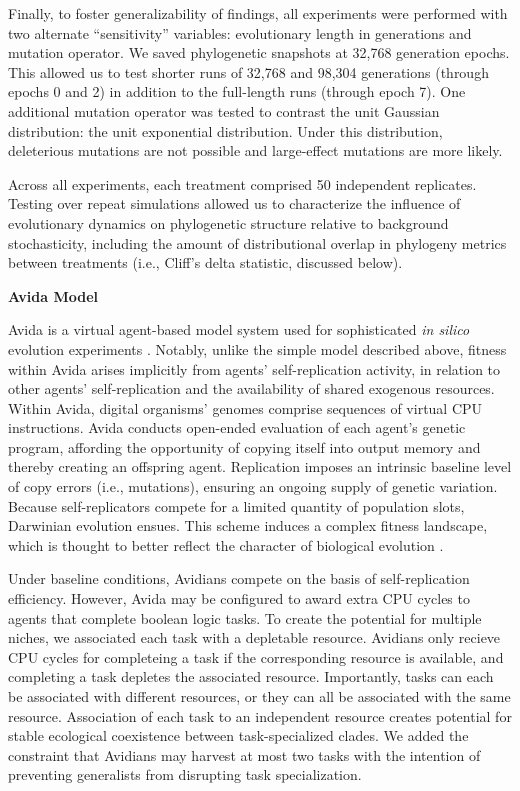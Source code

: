 Finally, to foster generalizability of findings, all experiments were performed with two alternate ``sensitivity'' variables: evolutionary length in generations and mutation operator.
We saved phylogenetic snapshots at 32,768 generation epochs.
This allowed us to test shorter runs of 32,768 and 98,304 generations (through epochs 0 and 2) in addition to the full-length runs (through epoch 7).
One additional mutation operator was tested to contrast the unit Gaussian distribution: the unit exponential distribution.
Under this distribution, deleterious mutations are not possible and large-effect mutations are more likely.

Across all experiments, each treatment comprised 50 independent replicates.
Testing over repeat simulations allowed us to characterize the influence of evolutionary dynamics on phylogenetic structure relative to background stochasticity, including the amount of distributional overlap in phylogeny metrics between treatments (i.e., Cliff's delta statistic, discussed below).

\noindent
\textbf{Avida Model}

\noindent
Avida is a virtual agent-based model system used for sophisticated \textit{in silico} evolution experiments \citep{ofria2004avida}.
Notably, unlike the simple model described above, fitness within Avida arises implicitly from agents' self-replication activity, in relation to other agents' self-replication and the availability of shared exogenous resources.
Within Avida, digital organisms' genomes comprise sequences of virtual CPU instructions.
Avida conducts open-ended evaluation of each agent's genetic program, affording the opportunity of copying itself into output memory and thereby creating an offspring agent.
Replication imposes an intrinsic baseline level of copy errors (i.e., mutations), ensuring an ongoing supply of genetic variation.
Because self-replicators compete for a limited quantity of population slots, Darwinian evolution ensues.
This scheme induces a complex fitness landscape, which is thought to better reflect the character of biological evolution \citep{adami2006digital}.

Under baseline conditions, Avidians compete on the basis of self-replication efficiency.
However, Avida may be configured to award extra CPU cycles to agents that complete boolean logic tasks.
To create the potential for multiple niches, we associated each task with a depletable resource.
Avidians only recieve CPU cycles for completeing a task if the corresponding resource is available, and completing a task depletes the associated resource.
Importantly, tasks can each be associated with different resources, or they can all be associated with the same resource.
Association of each task to an independent resource creates potential for stable ecological coexistence between task-specialized clades.
We added the constraint that Avidians may harvest at most two tasks with the intention of preventing generalists from disrupting task specialization.

